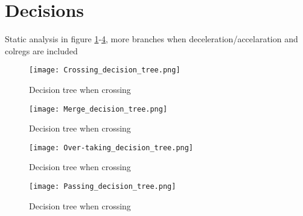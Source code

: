 \section{Decisions}
Static analysis in figure \ref{fig:Crossing_decision_tree}-\ref{fig:Passing_decision_tree}, more branches when deceleration/accelaration and colregs are included

\begin{figure}[p]
	\centering
	\texttt{[image: Crossing\_decision\_tree.png]}
	\caption{Decision tree when crossing}
	\label{fig:Crossing_decision_tree}
\end{figure}


\begin{figure}[p]
	\centering
	\texttt{[image: Merge\_decision\_tree.png]}
	\caption{Decision tree when crossing}
	\label{fig:Merge_decision_tree}
\end{figure}


\begin{figure}[p]
	\centering
	\texttt{[image: Over-taking\_decision\_tree.png]}
	\caption{Decision tree when crossing}
	\label{fig:Over-taking_decision_tree}
\end{figure}


\begin{figure}[p]
	\centering
	\texttt{[image: Passing\_decision\_tree.png]}
	\caption{Decision tree when crossing}
	\label{fig:Passing_decision_tree}
\end{figure}


